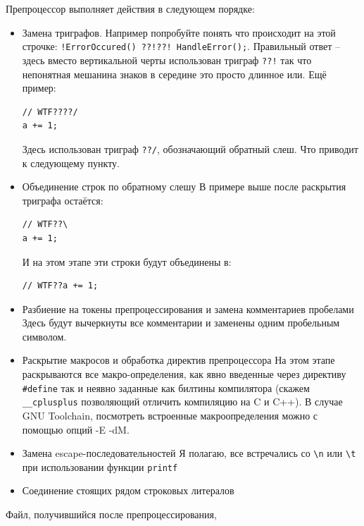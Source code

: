 \documentclass[a4paper,12pt,oneside]{article}
\begin{document}
Препроцессор выполняет действия в следующем порядке:
\begin{itemize}
\item Замена триграфов.
Например попробуйте понять что происходит на этой строчке: \lstinline$!ErrorOccured() ??!??! HandleError();$. Правильный ответ -- здесь вместо вертикальной черты использован триграф \lstinline$??!$ так что непонятная мешанина знаков в середине это просто длинное или. Ещё пример: 

\begin{lstlisting}
// WTF????/
a += 1;
\end{lstlisting}

Здесь использован триграф \lstinline$??/$, обозначающий обратный слеш. Что приводит к следующему пункту.
\item Объединение строк по обратному слешу
В примере выше после раскрытия триграфа остаётся:
\begin{lstlisting}
// WTF??\
a += 1;
\end{lstlisting}
И на этом этапе эти строки будут объединены в:
\begin{lstlisting}
// WTF??a += 1;
\end{lstlisting}
\item Разбиение на токены препроцессирования и замена комментариев пробелами
Здесь будут вычеркнуты все комментарии и заменены одним пробельным символом.
\item Раскрытие макросов и обработка директив препроцессора
На этом этапе раскрываются все макро-определения, как явно введенные через директиву \lstinline!#define! так и неявно заданные как билтины компилятора (скажем \lstinline!__cplusplus! позволяющий отличить компиляцию на C и C++). В случае GNU Toolchain, посмотреть встроенные макроопределения можно с помощью опций -E -dM.
\item Замена escape-последовательностей
Я полагаю, все встречались со \lstinline!\n! или \lstinline!\t! при использовании функции \lstinline!printf!
\item Соединение стоящих рядом строковых литералов
\end{itemize}

Файл, получившийся после препроцессирования,
\end{document}
